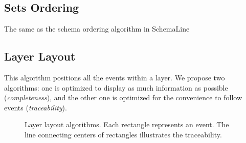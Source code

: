 \subsection{Sets Ordering}
The same as the schema ordering algorithm in SchemaLine

\subsection{Layer Layout}
This algorithm positions all the events within a layer. We propose two algorithms: one is optimized to display as much information as possible (\emph{completeness}), and the other one is optimized for the convenience to follow events (\emph{traceability}).

\begin{figure}[!htb]
	\centering
	\hfill
	\caption{Layer layout algorithms. Each rectangle represents an event. The line connecting centers of rectangles illustrates the  traceability.}
	\label{fig:traceability}
\end{figure}

